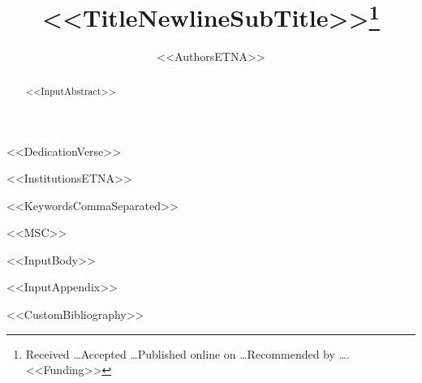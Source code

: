\documentclass[%
leqno,
letterpaper,
<<DocumentClassOptions>>]{etna-scoop}
\title{<<TitleNewlineSubTitle>>\thanks{Received \ldots Accepted \ldots Published online on \ldots Recommended by \ldots. <<Funding>>}}
\author{<<AuthorsETNA>>}
\begin{document}
\maketitle

<<DedicationVerse>>

\renewcommand{\thefootnote}{\fnsymbol{footnote}}
<<InstitutionsETNA>>

\begin{abstract}
<<InputAbstract>>
\end{abstract}

\begin{keywords}
<<KeywordsCommaSeparated>>
\end{keywords}

\begin{AMS}
<<MSC>>
\end{AMS}

<<InputBody>>

\appendix
<<InputAppendix>>


<<CustomBibliography>>
\end{document}
